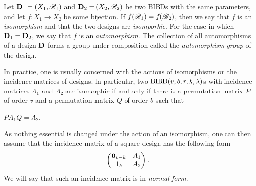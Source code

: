 \documentclass[../../../main]{subfiles}
\begin{document}
\begin{defin}\label{isomorphisms}
 Let $\mathbf{D}_1=(X_1,\mathscr{B}_1)$ and $\mathbf{D}_2=(X_2,\mathscr{B}_2)$ be two BIBDs with the same parameters, and let $f: X_1 \rightarrow X_2$ be some bijection. If $f(\mathscr{B}_1) = f(\mathscr{B}_2)$, then we say that $f$ is an {\it isomorphism} and that the two designs are {\it isomporhic}. For the case in which $\mathbf{D}_1 = \mathbf{D}_2$, we say that $f$ is an {\it automorphism}. The collection of all automorphisms of a design $\mathbf{D}$ forms a group under composition called the {\it automorphism group} of the design.

In practice, one is usually concerned with the actions of isomorphisms on the incidence matrices of designs. In particular, two $\text{BIBD}(v,b,r,k,\lambda)$s with incidence matrices $A_1$ and $A_2$ are isomorphic if and only if there is a permutation matrix $P$ of order $v$ and a permutation matrix $Q$ of order $b$ such that 
\begin{defenum}
\item\label{binary-equiv} $PA_1Q = A_2$.
\end{defenum}
\end{defin}

\begin{defin}
As nothing essential is changed under the action of an isomorphism, one can then assume that the incidence matrix of a square design has the following form
\begin{equation}
    \begin{pmatrix}
     \mathbf{0}_{v-k} & A_1 \\
     \mathbf{1}_k & A_2
    \end{pmatrix}.
\end{equation}
We will say that such an incidence matrix is in {\it normal form}.
\end{defin}
\end{document}
